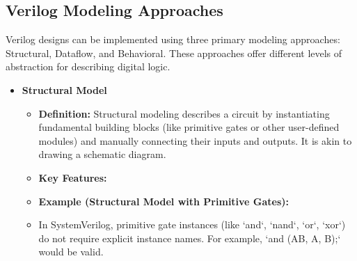 \documentclass{article}
\begin{document}
\subsection{Verilog Modeling Approaches}

Verilog designs can be implemented using three primary modeling approaches: Structural, Dataflow, and Behavioral. These approaches offer different levels of abstraction for describing digital logic.

\begin{itemize}
    \item \textbf{Structural Model}
    
    \begin{itemize}
        \item \textbf{Definition:} Structural modeling describes a circuit by instantiating fundamental building blocks (like primitive gates or other user-defined modules) and manually connecting their inputs and outputs. It is akin to drawing a schematic diagram.
        \item \textbf{Key Features:}
        
        \item \textbf{Example (Structural Model with Primitive Gates):}
        
        \item In SystemVerilog, primitive gate instances (like `and`, `nand`, `or`, `xor`) do not require explicit instance names. For example, `and (AB, A, B);` would be valid.
    \end{itemize}
    

\end{itemize}
\end{document}
